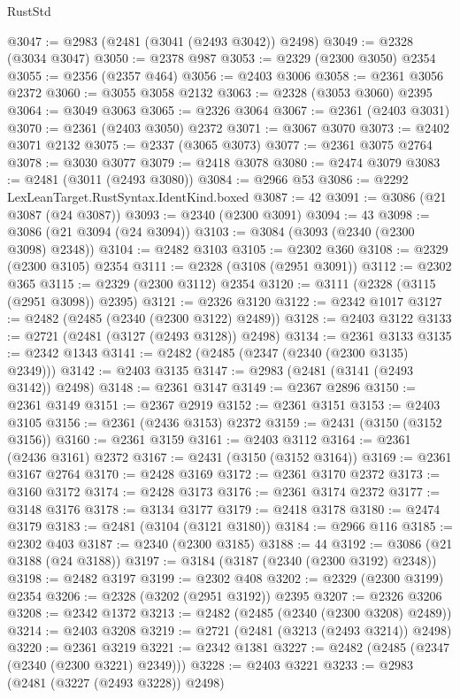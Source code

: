 \begin{lexlean}{RustStd}
\begin{coremodule}
@3047 := @2983 (@2481 (@3041 (@2493 @3042)) @2498)
@3049 := @2328 (@3034 @3047)
@3050 := @2378 @987
@3053 := @2329 (@2300 @3050) @2354
@3055 := @2356 (@2357 @464)
@3056 := @2403 @3006
@3058 := @2361 @3056 @2372
@3060 := @3055 @3058 @2132
@3063 := @2328 (@3053 @3060) @2395
@3064 := @3049 @3063
@3065 := @2326 @3064
@3067 := @2361 (@2403 @3031)
@3070 := @2361 (@2403 @3050) @2372
@3071 := @3067 @3070
@3073 := @2402 @3071 @2132
@3075 := @2337 (@3065 @3073)
@3077 := @2361 @3075 @2764
@3078 := @3030 @3077
@3079 := @2418 @3078
@3080 := @2474 @3079
@3083 := @2481 (@3011 (@2493 @3080))
@3084 := @2966 @53
@3086 := @2292 LexLeanTarget.RustSyntax.IdentKind.boxed
@3087 := 42
@3091 := @3086 (@21 @3087 (@24 @3087))
@3093 := @2340 (@2300 @3091)
@3094 := 43
@3098 := @3086 (@21 @3094 (@24 @3094))
@3103 := @3084 (@3093 (@2340 (@2300 @3098) @2348))
@3104 := @2482 @3103
@3105 := @2302 @360
@3108 := @2329 (@2300 @3105) @2354
@3111 := @2328 (@3108 (@2951 @3091))
@3112 := @2302 @365
@3115 := @2329 (@2300 @3112) @2354
@3120 := @3111 (@2328 (@3115 (@2951 @3098)) @2395)
@3121 := @2326 @3120
@3122 := @2342 @1017
@3127 := @2482 (@2485 (@2340 (@2300 @3122) @2489))
@3128 := @2403 @3122
@3133 := @2721 (@2481 (@3127 (@2493 @3128)) @2498)
@3134 := @2361 @3133
@3135 := @2342 @1343
@3141 := @2482 (@2485 (@2347 (@2340 (@2300 @3135) @2349)))
@3142 := @2403 @3135
@3147 := @2983 (@2481 (@3141 (@2493 @3142)) @2498)
@3148 := @2361 @3147
@3149 := @2367 @2896
@3150 := @2361 @3149
@3151 := @2367 @2919
@3152 := @2361 @3151
@3153 := @2403 @3105
@3156 := @2361 (@2436 @3153) @2372
@3159 := @2431 (@3150 (@3152 @3156))
@3160 := @2361 @3159
@3161 := @2403 @3112
@3164 := @2361 (@2436 @3161) @2372
@3167 := @2431 (@3150 (@3152 @3164))
@3169 := @2361 @3167 @2764
@3170 := @2428 @3169
@3172 := @2361 @3170 @2372
@3173 := @3160 @3172
@3174 := @2428 @3173
@3176 := @2361 @3174 @2372
@3177 := @3148 @3176
@3178 := @3134 @3177
@3179 := @2418 @3178
@3180 := @2474 @3179
@3183 := @2481 (@3104 (@3121 @3180))
@3184 := @2966 @116
@3185 := @2302 @403
@3187 := @2340 (@2300 @3185)
@3188 := 44
@3192 := @3086 (@21 @3188 (@24 @3188))
@3197 := @3184 (@3187 (@2340 (@2300 @3192) @2348))
@3198 := @2482 @3197
@3199 := @2302 @408
@3202 := @2329 (@2300 @3199) @2354
@3206 := @2328 (@3202 (@2951 @3192)) @2395
@3207 := @2326 @3206
@3208 := @2342 @1372
@3213 := @2482 (@2485 (@2340 (@2300 @3208) @2489))
@3214 := @2403 @3208
@3219 := @2721 (@2481 (@3213 (@2493 @3214)) @2498)
@3220 := @2361 @3219
@3221 := @2342 @1381
@3227 := @2482 (@2485 (@2347 (@2340 (@2300 @3221) @2349)))
@3228 := @2403 @3221
@3233 := @2983 (@2481 (@3227 (@2493 @3228)) @2498)

\end{coremodule}
\end{lexlean}
